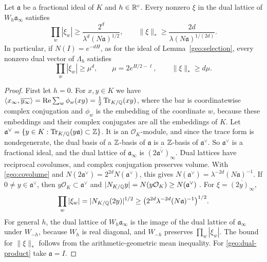 \begin{lemma}\label{geo:dual}
Let $\mathfrak a$ be a fractional ideal of $K$ and $h\in\mathbb R^c$. Every
nonzero $\xi$ in the dual lattice of $W_h\mathfrak a_\infty$ satisfies
\[
 \prod_w|\xi_w|\ge\frac{2^d}{\lambda^d(N\mathfrak a)^{1/2}},
 \qquad
 \|\xi\|_*\ge\frac{2d}{\lambda(N\mathfrak a)^{1/(2d)}}.
\]
In particular, if $N(I)=e^{-dH}$, as for the ideal of
Lemma~\ref{geo:selection}, every nonzero dual vector of $\Lambda_h$
satisfies
\begin{equation}\label{geo:dual-product}
 \prod_w|\xi_w|\ge\mu^d,\qquad \mu=2e^{H/2-\ell},\qquad
 \|\xi\|_*\ge d\mu.
\end{equation}
\end{lemma}

\begin{proof}
First let $h=0$. For $x,y\in K$ we have
$\langle x_\infty,\overline{y_\infty}\rangle
=\operatorname{Re}\sum_w\phi_w(xy)=\tfrac12\operatorname{Tr}_{K/\mathbb Q}(xy)$, where the
bar is coordinatewise complex conjugation and $\phi_w$ is the
embedding of the coordinate $w$, because these embeddings and their
complex conjugates are all the embeddings of $K$. Let
$\mathfrak a^\vee=\{y\in K:\operatorname{Tr}_{K/\mathbb Q}(y\mathfrak a)\subset\mathbb Z\}$. It is an
$\mathcal O_K$-module, and since the trace form is nondegenerate, the
dual basis of a $\mathbb Z$-basis of $\mathfrak a$ is a $\mathbb Z$-basis of
$\mathfrak a^\vee$. So $\mathfrak a^\vee$ is a fractional ideal, and
the dual lattice of $\mathfrak a_\infty$ is
$\overline{(2\mathfrak a^\vee)_\infty}$. Dual lattices have reciprocal
covolumes, and complex conjugation preserves volume. With
\eqref{geo:covolume} and $N(2\mathfrak a^\vee)=2^{2d}N(\mathfrak a^\vee)$, this
gives $N(\mathfrak a^\vee)=\lambda^{-2d}(N\mathfrak a)^{-1}$. If
$0\ne y\in\mathfrak a^\vee$, then $y\mathcal O_K\subset\mathfrak a^\vee$
and $|N_{K/\mathbb Q}y|=N(y\mathcal O_K)\ge N(\mathfrak a^\vee)$
\cite[Propositions~4.1 and~4.2]{MilneANT}. For
$\xi=\overline{(2y)_\infty}$,
\[
 \prod_w|\xi_w|=|N_{K/\mathbb Q}(2y)|^{1/2}
 \ge\bigl(2^{2d}\lambda^{-2d}(N\mathfrak a)^{-1}\bigr)^{1/2}.
\]
For general $h$, the dual lattice of $W_h\mathfrak a_\infty$ is the
image of the dual lattice of $\mathfrak a_\infty$ under $W_{-h}$,
because $W_h$ is real diagonal, and $W_{-h}$ preserves
$\prod_w|\xi_w|$. The bound for $\|\xi\|_*$ follows from the
arithmetic-geometric mean inequality. For \eqref{geo:dual-product} take
$\mathfrak a=I$.
\end{proof}

